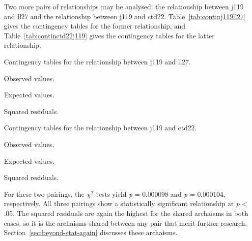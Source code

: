 Two more pairs of relationships may be analysed: the relationship between \gls{j119} and \gls{ll27} and the relationship between \gls{j119} and \gls{ctd22}. Table~\ref{tab:continj119ll27} gives the contingency tables for the former relationship, and Table~\ref{tab:continctd22j119} gives the contingency tables for the latter relationship. 
\begin{table}[h]
  \centering
  \caption{Contingency tables for the relationship between \acrshort{j119} and \acrshort{ll27}.}
  \label{tab:continj119ll27}
  \begin{subtable}[b]{0.5\linewidth}
    \centering
    \caption{Observed values.}
    \label{stab:obsj119ll27}
  \end{subtable}%
  \begin{subtable}[b]{0.5\linewidth}
    \centering
    \caption{Expected values.}
    \label{stab:expj119ll27}
  \end{subtable}
  \begin{subtable}[b]{0.5\linewidth}
    \centering
    \caption{Squared residuals.}
    \label{stab:sqresj119ll27}
  \end{subtable}
\end{table}

\begin{table}[h]
  \centering
  \caption{Contingency tables for the relationship between \acrshort{j119} and \acrshort{ctd22}.}
  \label{tab:continctd22j119}
  \begin{subtable}[b]{0.5\linewidth}
    \centering
    \caption{Observed values.}
    \label{stab:obsctd22j119}
  \end{subtable}%
  \begin{subtable}[b]{0.5\linewidth}
    \centering
    \caption{Expected values.}
    \label{stab:expctd22j119}
  \end{subtable}
  \begin{subtable}[b]{0.5\linewidth}
    \centering
    \caption{Squared residuals.}
    \label{stab:sqresctd22j119}
  \end{subtable}
\end{table}
For these two pairings, the \(\chi^2\)-tests yield \emph{p} = 0.000098 and \emph{p} = 0.000104, respectively. All three pairings show a statistically significant relationship at \textit{p} < .05. The squared residuals are again the highest for the shared archaisms in both cases, so it is the archaisms shared between any pair that merit further research. Section~\ref{sec:beyond-stat-again}  discusses these archaisms.

